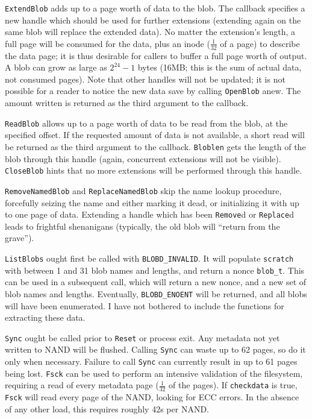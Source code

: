 \documentclass[letterpaper,10pt]{article}
\begin{document}
\texttt{ExtendBlob} adds up to a page worth of data to the blob. The callback
specifies a new handle which should be used for further extensions (extending
again on the same blob will replace the extended data). No matter the extension's
length, a full page will be consumed for the data, plus an inode ($\frac{1}{32}$
of a page) to describe the data page; it is thus desirable for callers to
buffer a full page worth of output. A blob can grow as large as $2^{24}-1$
bytes (16MB; this is the sum of actual data, not consumed pages). Note that
other handles will not be updated; it is not possible for a reader to notice
the new data save by calling \texttt{OpenBlob} anew. The amount written is
returned as the third argument to the callback.

\texttt{ReadBlob} allows up to a page worth of data to be read from the blob,
at the specified offset. If the requested amount of data is not available, a
short read will be returned as the third argument to the callback. \texttt{Bloblen}
gets the length of the blob through this handle (again, concurrent extensions
will not be visible). \texttt{CloseBlob} hints that no more extensions will
be performed through this handle.

\texttt{RemoveNamedBlob} and \texttt{ReplaceNamedBlob} skip the name lookup
procedure, forcefully seizing the name and either marking it dead, or
initializing it with up to one page of data. Extending a handle which has been
\texttt{Remove}d or \texttt{Replace}d leads to frightful shenanigans (typically,
the old blob will ``return from the grave'').

\texttt{ListBlobs} ought first be called with \texttt{BLOBD\_INVALID}. It will
populate \texttt{scratch} with between 1 and 31 blob names and lengths, and
return a nonce \texttt{blob\_t}. This can be used in a subsequent call, which
will return a new nonce, and a new set of blob names and lengths. Eventually,
\texttt{BLOBD\_ENOENT} will be returned, and all blobs will have been
enumerated. I have not bothered to include the functions for extracting these
data.

\texttt{Sync} ought be called prior to \texttt{Reset} or process exit. Any
metadata not yet written to NAND will be flushed. Calling \texttt{Sync} can
waste up to 62 pages, so do it only when necessary. Failure to call \texttt{Sync}
can currently result in up to 61 pages being lost. \texttt{Fsck} can be used to
perform an intensive validation of the filesystem, requiring a read of every
metadata page ($\frac{1}{32}$ of the pages). If \texttt{checkdata} is true, \texttt{Fsck}
will read every page of the NAND, looking for ECC errors. In the absence of
any other load, this requires roughly 42s per NAND.
\end{document}
